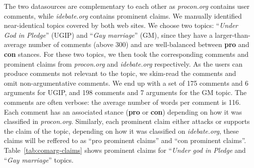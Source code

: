 The two datasources are complementary to each other as \textit{procon.org}
contains user comments, while \textit{idebate.org} contains prominent claims. 
We manually identified near-identical topics covered by both web sites. 
We choose two topics: ``\textit{Under God in Pledge}'' (UGIP) and 
``\textit{Gay marriage}'' (GM), since
they have a larger-than-average number of comments (above 300) and are 
well-balanced between \textbf{pro} and \textbf{con} stances. 
For these two topics, we then took the corresponding comments and prominent claims
from \textit{procon.org} and \textit{idebate.org} respectively. 
As the users can produce comments not relevant to the topic, we skim-read 
the comments and omit non-argumentative comments.  We end up with a set of 175
comments and 6 arguments for UGIP, and 198 comments and 7 arguments for the GM
topic. 
The comments are often verbose: the average number of words per comment is 116. 
Each comment has an associated stance (\textbf{pro} or \textbf{con}) depending on 
how it was classified in \textit{procon.org}. 
Similarly, each prominent claim either attacks or supports the claim of the topic,
depending on how it was classified on \textit{idebate.org}, these claims will be reffered to 
as ``pro prominent claims'' and ``con prominent claims''. 
Table~\ref{tab:comarg-claims} shows prominent claims for ``\emph{Under god in Pledge}
and ``\textit{Gay marriage}'' topics. 

